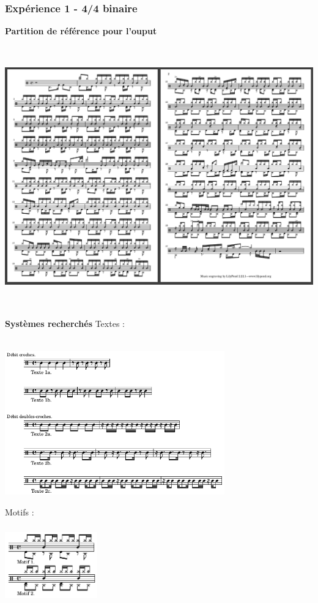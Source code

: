 \subsubsection{Expérience 1 - 4/4 binaire}
\textbf{Partition de référence pour l’ouput}
\includegraphics[height=120mm, width=160mm]{z_images/4_experimentations/experience_1/partition.png}
\textbf{Systèmes recherchés}
Textes :\\\\
\includegraphics[height=70mm, width=95mm]{z_images/1_description_notation/systemes/0_textes_4-4_binaires.png}\\
Motifs :\\\\
\includegraphics[height=30mm, width=40mm]{z_images/1_description_notation/systemes/1_motifs_4-4_binaires.png}\\\\
